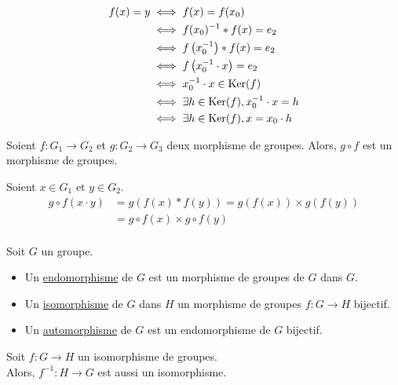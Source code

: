 \begin{prv}
	\begin{align*}
		f(x) = y &\iff f(x) = f(x_0)\\
						 &\iff f(x_0)^{-1} * f(x) = e_2\\
						 &\iff f\left( x_0^{-1} \right) * f(x) = e_2\\
						 &\iff f\left( x_0^{-1} \cdot x \right) = e_2\\
						 &\iff x_0^{-1}\cdot x \in \operatorname{Ker}(f)\\
						 &\iff\exists h \in \operatorname{Ker}(f), x_0^{-1} \cdot x = h\\
						 &\iff \exists h \in \operatorname{Ker}(f), x = x_0 \cdot h
	\end{align*}
\end{prv}

\begin{prop}
	Soient $f: G_1 \to G_2$ et $g: G_2 \to G_3$ deux morphisme de groupes.
	Alors, $g \circ f$ est un morphisme de groupes.
\end{prop}

\begin{prv}
	Soient $x \in G_1$ et $y \in G_2$.
	\begin{align*}
		g \circ f(x \cdot y) &= g(f(x) * f(y)) = g(f(x)) \times g(f(y)) \\
		&= g \circ f (x) \times g \circ f (y) \\
	\end{align*}
\end{prv}

\begin{defn}
	Soit $G$ un groupe. \\
	\begin{itemize}
		\item Un \underline{endomorphisme} de  $G$ est un morphisme de groupes de $G$ dans $G$.\\
		\item Un \underline{isomorphisme} de  $G$ dans $H$ un morphisme de groupes $f: G \to H$ bijectif.\\
		\item Un \underline{automorphisme} de $G$ est un endomorphisme de $G$ bijectif.
	\end{itemize}
\end{defn}

\begin{prop}
	Soit $f: G \to H$ un isomorphisme de groupes.\\
	Alors, $f^{-1}: H \to G$ est aussi un isomorphisme.
\end{prop}

